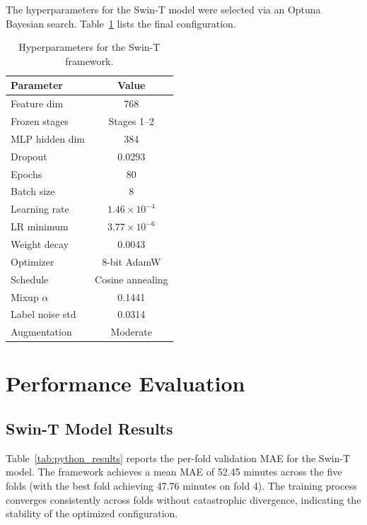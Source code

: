 \documentclass[9pt, a4paper, twocolumn]{article}
\begin{document}
The hyperparameters for the Swin-T model were selected via an Optuna Bayesian search. Table~\ref{tab:python_params} lists the final configuration.

\begin{table}[H]
\centering
\footnotesize
\caption{Hyperparameters for the Swin-T framework.}
\label{tab:python_params}
\begin{tabular}{lc}
\toprule
\textbf{Parameter} & \textbf{Value} \\
\midrule
Feature dim         & 768 \\
Frozen stages       & Stages 1--2 \\
MLP hidden dim      & 384 \\
Dropout             & 0.0293 \\
Epochs              & 80 \\
Batch size          & 8 \\
Learning rate       & $1.46\times10^{-4}$ \\
LR minimum          & $3.77\times10^{-6}$ \\
Weight decay        & 0.0043 \\
Optimizer           & 8-bit AdamW \\
Schedule            & Cosine annealing \\
Mixup $\alpha$      & 0.1441 \\
Label noise std     & 0.0314 \\
Augmentation        & Moderate \\
\bottomrule
\end{tabular}
\end{table}

\section{Performance Evaluation}
\label{sec:results}

\subsection{Swin-T Model Results}

Table~\ref{tab:python_results} reports the per-fold validation MAE for the Swin-T model. The framework achieves a mean MAE of 52.45 minutes across the five folds (with the best fold achieving 47.76 minutes on fold 4). The training process converges consistently across folds without catastrophic divergence, indicating the stability of the optimized configuration.
\end{document}
